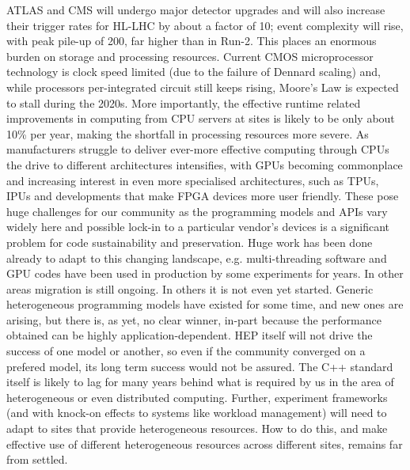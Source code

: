 \documentclass[10pt,a4paper]{article}
\begin{document}
ATLAS and CMS will undergo major detector upgrades and will also
increase their trigger rates for HL-LHC by about a factor of 10; event
complexity will rise, with peak pile-up of 200, far higher than in
Run-2. This places an enormous burden on storage and processing
resources. Current CMOS microprocessor technology is clock speed limited
(due to the failure of Dennard scaling) and, while processors
per-integrated circuit still keeps rising, Moore's Law is expected to
stall during the 2020s. More importantly, the effective runtime related
improvements in computing from CPU servers at sites is likely to be only
about 10\% per year, making the shortfall in processing resources more
severe. As manufacturers struggle to deliver ever-more effective
computing through CPUs the drive to different architectures intensifies,
with GPUs becoming commonplace and increasing interest in even more
specialised architectures, such as TPUs, IPUs and developments that make
FPGA devices more user friendly. These pose huge challenges for our
community as the programming models and APIs vary widely here and
possible lock-in to a particular vendor's devices is a significant
problem for code sustainability and preservation. Huge work has been
done already to adapt to this changing landscape, e.g. multi-threading
software and GPU codes have been used in production by some experiments
for years. In other areas migration is still ongoing. In others it is
not even yet started. Generic heterogeneous programming models have
existed for some time, and new ones are arising, but there is, as yet,
no clear winner, in-part because the performance obtained can be highly
application-dependent. HEP itself will not drive the success of one
model or another, so even if the community converged on a prefered
model, its long term success would not be assured. The C++ standard
itself is likely to lag for many years behind what is required by us in
the area of heterogeneous or even distributed computing. Further,
experiment frameworks (and with knock-on effects to systems like
workload management) will need to adapt to sites that provide
heterogeneous resources. How to do this, and make effective use of
different heterogeneous resources across different sites, remains far
from settled.
\end{document}
